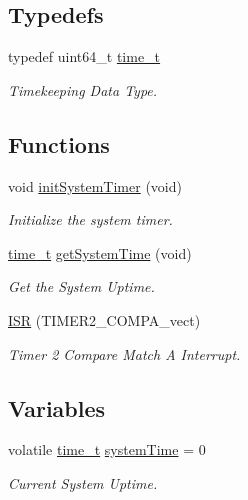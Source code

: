 \subsection*{Typedefs}
\begin{DoxyCompactItemize}
\item 
typedef uint64\-\_\-t \hyperlink{group__time_ga02ad034d26db2c14b7e295b0c50fc11d}{time\-\_\-t}
\begin{DoxyCompactList}\small\item\em Timekeeping Data Type. \end{DoxyCompactList}\end{DoxyCompactItemize}
\subsection*{Functions}
\begin{DoxyCompactItemize}
\item 
void \hyperlink{group__time_ga66bac2517b216a802f8fb2233eccfa66}{init\-System\-Timer} (void)
\begin{DoxyCompactList}\small\item\em Initialize the system timer. \end{DoxyCompactList}\item 
\hyperlink{group__time_ga02ad034d26db2c14b7e295b0c50fc11d}{time\-\_\-t} \hyperlink{group__time_ga158463b7abdb2191a9a364bce1faac83}{get\-System\-Time} (void)
\begin{DoxyCompactList}\small\item\em Get the System Uptime. \end{DoxyCompactList}\item 
\hyperlink{group__time_ga5686c229bdef50123688ab6cb1404230}{I\-S\-R} (T\-I\-M\-E\-R2\-\_\-\-C\-O\-M\-P\-A\-\_\-vect)
\begin{DoxyCompactList}\small\item\em Timer 2 Compare Match A Interrupt. \end{DoxyCompactList}\end{DoxyCompactItemize}
\subsection*{Variables}
\begin{DoxyCompactItemize}
\item 
volatile \hyperlink{group__time_ga02ad034d26db2c14b7e295b0c50fc11d}{time\-\_\-t} \hyperlink{group__time_ga90653843fa9b02271309112c1062bf4c}{system\-Time} = 0
\begin{DoxyCompactList}\small\item\em Current System Uptime. \end{DoxyCompactList}\end{DoxyCompactItemize}


